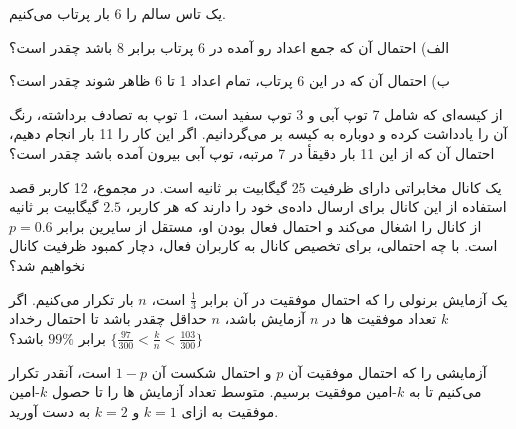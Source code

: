 



\Q
یک تاس سالم را 6 بار پرتاب می‌کنیم.

الف) احتمال آن که جمع اعداد رو آمده در 6 پرتاب برابر 8 باشد چقدر است؟

ب) احتمال آن که در این 6 پرتاب، تمام اعداد 1 تا 6 ظاهر شوند چقدر است؟


\Q
از کیسه‌ای که شامل 7 توپ آبی و 3 توپ سفید است، 1 توپ به تصادف برداشته، رنگ آن را یادداشت کرده و دوباره به کیسه بر می‌گردانیم. اگر این کار را 11 بار انجام دهیم، احتمال آن که از این 11 بار دقیقأ در 7 مرتبه، توپ آبی بیرون آمده باشد چقدر است؟


\Q
یک کانال مخابراتی دارای ظرفیت 25 گیگابیت بر ثانیه است. در مجموع، 12 کاربر قصد استفاده از این کانال برای ارسال داده‌ی خود را دارند که هر کاربر، $2.5$ گیگابیت بر ثانیه از کانال را اشغال می‌کند و احتمال فعال بودن او، مستقل از سایرین برابر $p=0.6$ است. با چه احتمالی، برای تخصیص کانال به کاربران فعال، دچار کمبود ظرفیت کانال نخواهیم شد؟


\Q
یک آزمایش برنولی را که احتمال موفقیت در آن برابر 
$
\frac{1}{3}
$
است، $n$ بار تکرار می‌کنیم. اگر $k$ تعداد موفقیت ها در $n$ آزمایش باشد، $n$ حداقل چقدر باشد تا احتمال رخداد 
$
\{\frac{97}{300}<\frac{k}{n}<\frac{103}{300}\}
$
برابر $99\%$ باشد؟


\Q
آزمایشی را که احتمال موفقیت آن $p$ و احتمال شکست آن $1-p$ است، آنقدر تکرار می‌کنیم تا به $k$-امین موفقیت برسیم. متوسط تعداد آزمایش ها را تا حصول $k$-امین موفقیت به ازای 
$k=1$
و
$k=2$
به دست آورید.